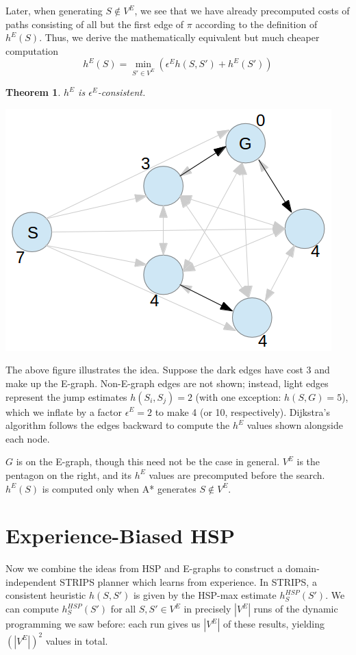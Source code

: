 \documentclass[letterpaper]{article}
\newtheorem{thm}{Theorem}
\begin{document}
Later, when generating $S \notin V^E$, we see that we have already precomputed costs of paths consisting of all but the first edge of $\pi$ according to the definition of $h^E(S)$. Thus, we derive the mathematically equivalent but much cheaper computation
\[h^E(S) = \min_{S'\in V^E} \left(\epsilon^E h(S,S') + h^E(S')\right)\]

\begin{thm}$h^E$ is $\epsilon^E$-consistent. \cite{phillips2012graphs}\end{thm}

\includegraphics[scale=0.4]{Pentagon.png}

The above figure illustrates the idea. Suppose the dark edges have cost 3 and make up the E-graph. Non-E-graph edges are not shown; instead, light edges represent the jump estimates $h(S_i,S_j) = 2$ (with one exception: $h(S,G) = 5$), which we inflate by a factor $\epsilon^E=2$ to make 4 (or 10, respectively). Dijkstra's algorithm follows the edges backward to compute the $h^E$ values shown alongside each node.

$G$ is on the E-graph, though this need not be the case in general. $V^E$ is the pentagon on the right, and its $h^E$ values are precomputed before the search. $h^E(S)$ is computed only when A* generates $S\notin V^E$.

\section{Experience-Biased HSP}

Now we combine the ideas from HSP and E-graphs to construct a domain-independent STRIPS planner which learns from experience. In STRIPS, a consistent heuristic $h(S,S')$ is given by the HSP-max estimate $h^{HSP}_S(S')$. We can compute $h^{HSP}_S(S')$ for all $S,S'\in V^E$ in precisely $|V^E|$ runs of the dynamic programming we saw before: each run gives us $|V^E|$ of these results, yielding $(|V^E|)^2$ values in total.
\end{document}
